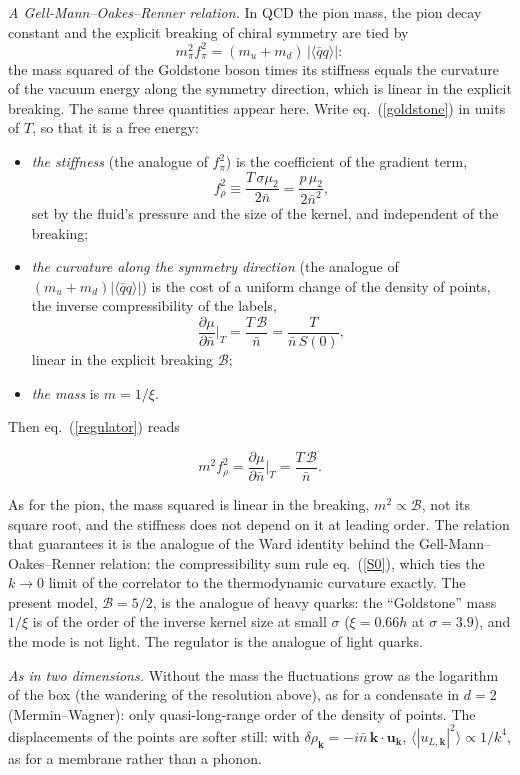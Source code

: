 \documentclass[11pt,aps,preprint,nofootinbib,superscriptaddress,tightenlines]{revtex4-2}
\newcommand{\avg}[1]{\langle #1\rangle}
\def\st{\begin{equation}}
\def\stp{\end{equation}}
\def\Eq#1{eq.~(\ref{#1})}
\begin{document}
\emph{A Gell-Mann--Oakes--Renner relation.}  In QCD the pion mass, the pion decay constant and the explicit breaking of chiral symmetry are tied by
\st
m_\pi^2f_\pi^2=(m_u+m_d)\,|\avg{\bar qq}| :
\stp
the mass squared of the Goldstone boson times its stiffness equals the curvature of the vacuum energy along the symmetry direction, which is linear in the
explicit breaking.  The same three quantities appear here.  Write \Eq{goldstone} in units of $T$, so that it is a free energy:
\begin{itemize}
\item \emph{the stiffness} (the analogue of $f_\pi^2$) is the coefficient of the gradient term,
  \st
  f_\rho^2\equiv\frac{T\,\sigma\mu_2}{2\bar n}=\frac{p\,\mu_2}{2\bar n^2} ,
  \stp
  set by the fluid's pressure and the size of the kernel, and independent of the breaking;
\item \emph{the curvature along the symmetry direction} (the analogue of $(m_u+m_d)|\avg{\bar qq}|$) is the cost of a uniform change of the density of points, the
  inverse compressibility of the labels,
  \st
  \frac{\partial\mu}{\partial\bar n}\Big|_T=\frac{T\,\mathcal B}{\bar n}=\frac{T}{\bar n\,S(0)} ,
  \stp
  linear in the explicit breaking $\mathcal B$;
\item \emph{the mass} is $m=1/\xi$.
\end{itemize}
Then \Eq{regulator} reads
\begin{keyeq}
\st
m^2f_\rho^2=\frac{\partial\mu}{\partial\bar n}\Big|_T=\frac{T\,\mathcal B}{\bar n} .
\label{gmor}
\stp
\end{keyeq}
As for the pion, the mass squared is linear in the breaking, $m^2\propto\mathcal B$, not its square root, and the stiffness does not depend on it at
leading order.  The relation that guarantees it is the analogue of the Ward identity behind the Gell-Mann--Oakes--Renner relation: the compressibility sum
rule \Eq{S0}, which ties the $k\to0$ limit of the correlator to the thermodynamic curvature exactly.  The present model, $\mathcal B=5/2$, is the
analogue of heavy quarks: the ``Goldstone'' mass $1/\xi$ is of the order of the inverse kernel size at small $\sigma$ ($\xi=0.66h$ at $\sigma=3.9$), and the
mode is not light.  The regulator is the analogue of light quarks.

\emph{As in two dimensions.}  Without the mass the fluctuations grow as the logarithm of the box (the wandering of the resolution above), as for a condensate in
$d=2$ (Mermin--Wagner): only quasi-long-range order of the density of points.  The displacements of the points are softer still: with
$\delta\rho_{\bm k}=-i\bar n\,\bm k\cdot\bm u_{\bm k}$, $\avg{|u_{L,\bm k}|^2}\propto1/k^4$, as for a membrane rather than a phonon.
\end{document}
